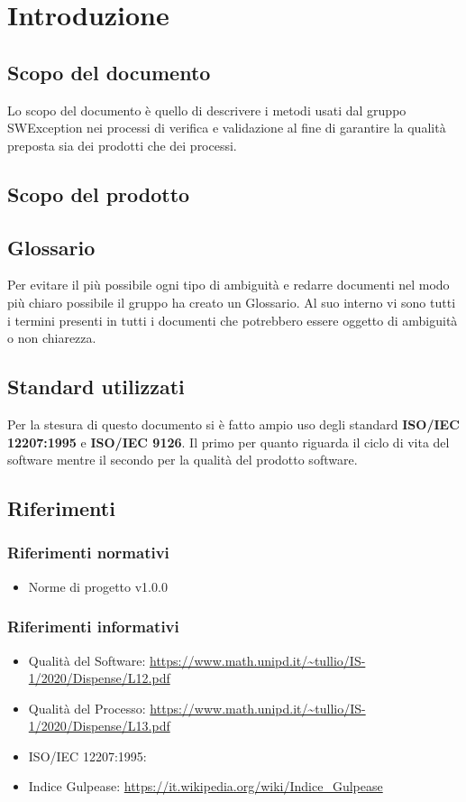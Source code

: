 \section{Introduzione}
\subsection{Scopo del documento}
Lo scopo del documento è quello di descrivere i metodi usati dal gruppo SWException nei processi di verifica e validazione al fine di garantire la qualità preposta sia dei prodotti che dei processi.
\subsection{Scopo del prodotto}

\subsection{Glossario}
Per evitare il più possibile ogni tipo di ambiguità e redarre documenti nel modo più chiaro possibile il gruppo ha creato un Glossario. Al suo interno vi sono tutti i termini presenti in tutti i documenti che potrebbero essere oggetto di ambiguità o non chiarezza.
\subsection{Standard utilizzati}
Per la stesura di questo documento si è fatto ampio uso degli standard \textbf{ISO/IEC 12207:1995} e \textbf{ISO/IEC 9126}. Il primo per quanto riguarda il ciclo di vita del software mentre il secondo per la qualità del prodotto software.
\subsection{Riferimenti}
\subsubsection{Riferimenti normativi}
\begin{itemize}
    \item Norme di progetto v1.0.0
\end{itemize}
\subsubsection{Riferimenti informativi}
\begin{itemize}
    \item Qualità del Software: \url{https://www.math.unipd.it/~tullio/IS-1/2020/Dispense/L12.pdf}
    \item Qualità del Processo: \url{https://www.math.unipd.it/~tullio/IS-1/2020/Dispense/L13.pdf}
    \item ISO/IEC 12207:1995: 
    \item Indice Gulpease: \url{https://it.wikipedia.org/wiki/Indice_Gulpease}
\end{itemize}
